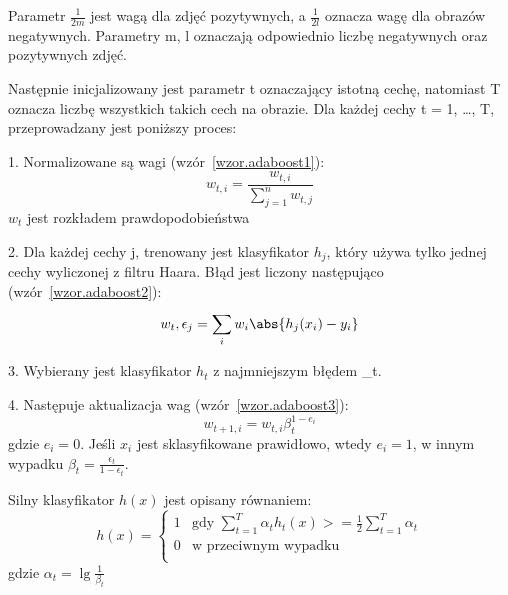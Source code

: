 \documentclass[a4paper,twoside,12pt]{book}
\begin{document}
    Parametr $\frac{1}{2m}$ jest wagą dla zdjęć pozytywnych, a $\frac{1}{2l}$ oznacza wagę dla obrazów negatywnych.
    Parametry m, l oznaczają odpowiednio liczbę negatywnych oraz pozytywnych zdjęć.

    Następnie inicjalizowany jest parametr t oznaczający istotną cechę, natomiast T oznacza liczbę wszystkich takich
    cech na obrazie.
    Dla każdej
    cechy t = 1, \ldots, T, przeprowadzany jest poniższy proces:

    1. Normalizowane są wagi (wzór~\ref{wzor.adaboost1}):
    \large
    \begin{equation}
        w_{t,i} = \frac{w_{t,i}}{\sum_{j=1}^{n}w_{t,j}}
        \label{wzor.adaboost1}
    \end{equation}
    \normalsize
    $w_{t}$ jest rozkładem prawdopodobieństwa

    2. Dla każdej cechy j, trenowany jest klasyfikator $h_{j}$, który używa tylko jednej cechy wyliczonej z filtru Haara.
    Błąd jest liczony następująco (wzór~\ref{wzor.adaboost2}):
    \large
    \begin{equation}
        w_{t}, \epsilon_{j} = \sum_{i}^{}w_{i} \abs{h_{j}(x_{i}) - y_{i}}
        \label{wzor.adaboost2}
    \end{equation}
    \normalsize

    3. Wybierany jest klasyfikator $h_{t}$ z najmniejszym błędem \epsilon_{t}.

    4. Następuje aktualizacja wag (wzór~\ref{wzor.adaboost3}):
    \large
    \begin{equation}
        w_{t+1,i} = w_{t,i}\beta_{t}^{1-e_{i}}
        \label{wzor.adaboost3}
    \end{equation}
    \normalsize
    gdzie $e_{i} = 0$. Jeśli $x_{i}$ jest sklasyfikowane prawidłowo, wtedy $e_{i}=1$,
    w innym wypadku $\beta_{t} = \frac{\epsilon_{t}}{1 - \epsilon_{t}}$.

    Silny klasyfikator $h(x)$ jest opisany równaniem:
    \large
    \begin{equation}
        h(x) = \left\{ \begin{array}{ll}
                           1 & \textrm{gdy $\sum_{t=1}^{T}\alpha_{t}h_{t}(x) >= \frac{1}{2} \sum_{t=1}^{T}\alpha_{t}$}\\
                           0 & \textrm{w przeciwnym wypadku}\\
        \end{array} \right.
        \label{wzor.adaboost4}
    \end{equation}
    \normalsize
    gdzie $\alpha_{t} = \lg \frac{1}{\beta_{t}}$
\end{document}
